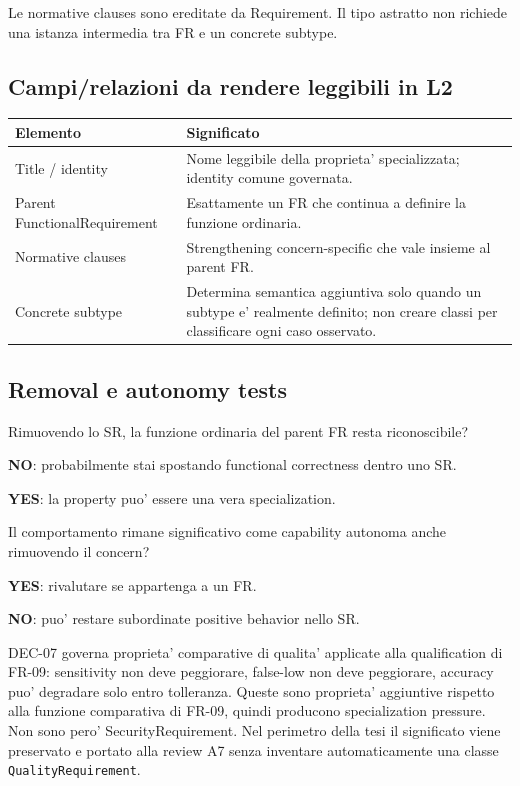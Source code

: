 \documentclass[11pt,a4paper]{article}
\begin{document}
Le normative clauses sono ereditate da Requirement. Il tipo astratto non richiede una istanza intermedia tra FR e un concrete subtype.

\subsection{Campi/relazioni da rendere leggibili in L2}

\begin{tabularx}{\textwidth}{L{42mm}Y}
\toprule
\textbf{Elemento} & \textbf{Significato} \\
\midrule
Title / identity & Nome leggibile della proprieta' specializzata; identity comune governata. \\
Parent FunctionalRequirement & Esattamente un FR che continua a definire la funzione ordinaria. \\
Normative clauses & Strengthening concern-specific che vale insieme al parent FR. \\
Concrete subtype & Determina semantica aggiuntiva solo quando un subtype e' realmente definito; non creare classi per classificare ogni caso osservato. \\
\bottomrule
\end{tabularx}

\subsection{Removal e autonomy tests}

\begin{ddtacheck}[title={Removal test}]
Rimuovendo lo SR, la funzione ordinaria del parent FR resta riconoscibile?\par
\textbf{NO}: probabilmente stai spostando functional correctness dentro uno SR.\par
\textbf{YES}: la property puo' essere una vera specialization.
\end{ddtacheck}

\begin{ddtacheck}[title={Autonomous capability test}]
Il comportamento rimane significativo come capability autonoma anche rimuovendo il concern?\par
\textbf{YES}: rivalutare se appartenga a un FR.\par
\textbf{NO}: puo' restare subordinate positive behavior nello SR.
\end{ddtacheck}

\begin{ddtaexample}[title={DermaTriage DEC-07 - specialization pressure non-security}]
DEC-07 governa proprieta' comparative di qualita' applicate alla qualification di FR-09: sensitivity non deve peggiorare, false-low non deve peggiorare, accuracy puo' degradare solo entro tolleranza. Queste sono proprieta' aggiuntive rispetto alla funzione comparativa di FR-09, quindi producono specialization pressure. Non sono pero' SecurityRequirement. Nel perimetro della tesi il significato viene preservato e portato alla review A7 senza inventare automaticamente una classe \texttt{QualityRequirement}.
\end{ddtaexample}
\end{document}
